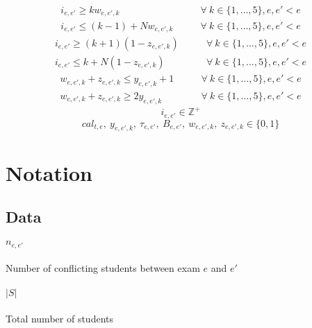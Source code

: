 \documentclass[11pt, a4paper, leqno]{article}
\begin{document}
	\begin{equation}
	\label{penaltyw}
	\begin{aligned}
	i_{e,e'} \geq k w_{e,e',k} &\qquad\forall\ k \in \{1,\dots,5\},e,e'<e\\
	i_{e,e'} \leq (k-1) + N  w_{e,e',k} &\qquad\forall\ k \in \{1,\dots,5\},e,e'<e
	\end{aligned}
	\end{equation}
	\begin{equation}
	\label{penaltyz}
	\begin{aligned}
	i_{e,e'} \geq \left(k+1\right)\left(1-z_{e,e',k}\right) &\qquad\forall\ k \in \{1,\dots,5\},e,e'<e\\
	i_{e,e'} \leq k + N  (1-z_{e,e',k}) &\qquad\forall\ k \in \{1,\dots,5\},e,e'<e
	\end{aligned}
	\end{equation}
	\begin{equation}
	\label{penaltyy}
	\begin{aligned}
	w_{e,e',k} + z_{e,e',k} \leq y_{e,e',k} + 1 &\qquad\forall\ k \in \{1,\dots,5\},e,e'<e\\
	w_{e,e',k} + z_{e,e',k} \geq 2y_{e,e',k} &\qquad\forall\ k \in \{1,\dots,5\},e,e'<e
	\end{aligned}
	\end{equation}
	\begin{equation}
	\label{domain1}
	i_{e,e'} \in \mathbb{Z}^{+}
	\end{equation}
	\begin{equation}
	\label{domain2}
	cal_{t,e},\ y_{e,e',k},\ \tau_{e,e'},\ B_{e,e'},\ w_{e,e',k},\ z_{e,e',k} \in \{0,1\}
	\end{equation}
	
	\section{Notation}
	
	\subsection{Data}
	
	\paragraph{$n_{e,e'}$} Number of conflicting students between exam $e$ and $e'$
	
	\paragraph{$\left|S\right|$} Total number of students
	
\end{document}
